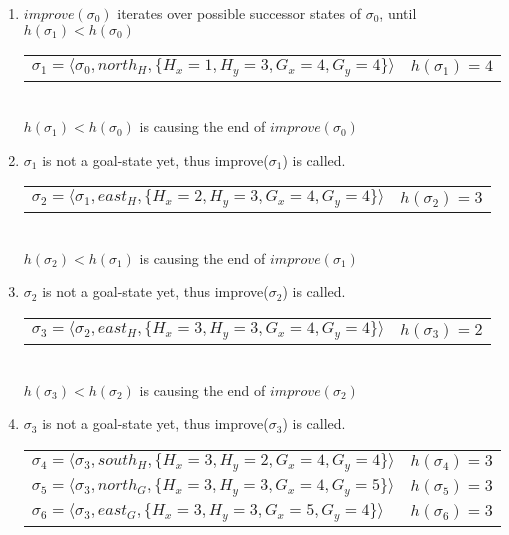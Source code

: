 \documentclass[11pt,a4paper]{article}
\begin{document}
\begin{enumerate}
\item
$improve(\sigma_0)$ iterates over possible successor states of $\sigma_0$, until $h(\sigma_1) < h(\sigma_0)$\\
\begin{tabular}{l r}
$\sigma_1 = \langle{}\sigma_0, north_H, \{H_x=1, H_y=3, G_x=4, G_y=4\}\rangle$ & $h(\sigma_1)=4$
\end{tabular}\\
$h(\sigma_1) < h(\sigma_0)$ is causing the end of $improve(\sigma_0)$

\item
$\sigma_1$ is not a goal-state yet, thus improve($\sigma_1$) is called.\\
\begin{tabular}{l r}
$\sigma_{2} = \langle{}\sigma_1, east_H, \{H_x=2, H_y=3, G_x=4, G_y=4\}\rangle$ & $h(\sigma_{2})=3$
\end{tabular}\\
$h(\sigma_2) < h(\sigma_1)$ is causing the end of $improve(\sigma_1)$

\item
 $\sigma_2$ is not a goal-state yet, thus improve($\sigma_2$) is called.\\
\begin{tabular}{l r}
$\sigma_{3} = \langle{}\sigma_{2}, east_H, \{H_x=3, H_y=3, G_x=4, G_y=4\}\rangle$ & $h(\sigma_{3})=2$
\end{tabular}\\
$h(\sigma_3) < h(\sigma_2)$ is causing the end of $improve(\sigma_2)$

\item
 $\sigma_3$ is not a goal-state yet, thus improve($\sigma_3$) is called.\\
\begin{tabular}{l r}
$\sigma_{4} = \langle{}\sigma_{3}, south_H, \{H_x=3, H_y=2, G_x=4, G_y=4\}\rangle$ & $h(\sigma_{4})=3$\\
$\sigma_{5} = \langle{}\sigma_{3}, north_G, \{H_x=3, H_y=3, G_x=4, G_y=5\}\rangle$ & $h(\sigma_{5})=3$\\
$\sigma_{6} = \langle{}\sigma_{3}, east_G, \{H_x=3, H_y=3, G_x=5, G_y=4\}\rangle$ & $h(\sigma_{6})=3$
\end{tabular}


\end{enumerate}
\end{document}
